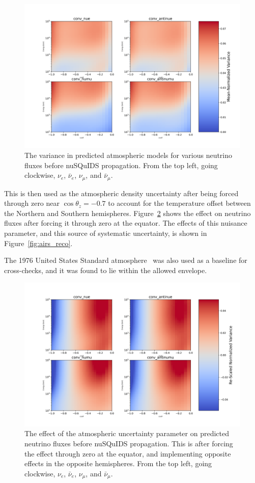 \documentclass[main.tex]{subfiles}
\begin{document}
\begin{figure}
    \centering
    \includegraphics[width=0.8\linewidth]{figures/airs_grid_var.png}
    \caption{The variance in predicted atmospheric models for various neutrino fluxes before nuSQuIDS propagation. From the top left, going clockwise, $\nu_{e}$, $\bar{\nu}_{e}$, $\nu_{\mu}$, and $\bar{\nu}_{\mu}$. }\label{fig:airs_raw}
\end{figure}

This is then used as the atmospheric density uncertainty after being forced through zero near $\cos\theta_{z}=-0.7$ to account for the temperature offset between the Northern and Southern hemispheres. 
Figure~\ref{fig:airs_grid} shows the effect on neutrino fluxes after forcing it through zero at the equator.
The effects of this nuisance parameter, and this source of systematic uncertainty, is shown in Figure~\ref{fig:airs_reco}.

The 1976 United States Standard atmosphere~\cite{united1976u} was also used as a baseline for cross-checks, and it was found to lie within the allowed envelope. 

\begin{figure}
    \centering
    \includegraphics[width=0.8\linewidth]{figures/airs_grid.png}
    \caption{The effect of the atmospheric uncertainty parameter on predicted neutrino fluxes before nuSQuIDS propagation. This is after forcing the effect through zero at the equator, and implementing opposite effects in the opposite hemispheres. From the top left, going clockwise, $\nu_{e}$, $\bar{\nu}_{e}$, $\nu_{\mu}$, and $\bar{\nu}_{\mu}$.}\label{fig:airs_grid}
\end{figure}
\end{document}
